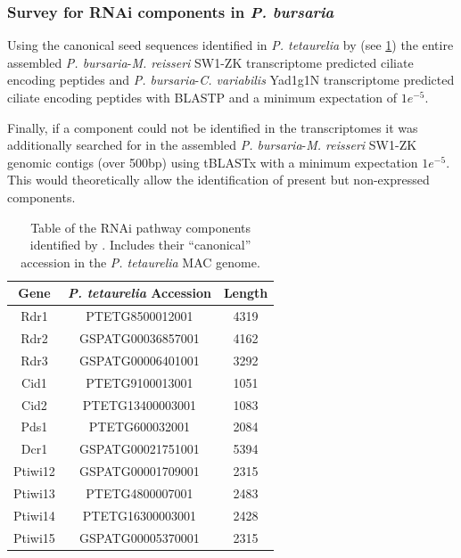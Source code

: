 \subsubsection{Survey for RNAi components in \textit{P. bursaria}}

Using the canonical seed sequences identified in \textit{P. tetaurelia}
by \citep{Marker2014} (see \cref{tab:rnai_seeds}) the entire assembled 
\textit{P. bursaria}-\textit{M. reisseri} SW1-ZK transcriptome predicted
ciliate encoding peptides and
\textit{P. bursaria}-\textit{C. variabilis} Yad1g1N transcriptome predicted 
ciliate encoding peptides with BLASTP and a minimum expectation
of \(1e^{-5}\).

Finally, if a component could not be identified in the transcriptomes
it was additionally searched for in the assembled \textit{P. bursaria}-\textit{M. reisseri} SW1-ZK
genomic contigs (over 500bp) using tBLASTx with a minimum expectation \(1e^{-5}\).
This would theoretically allow the identification of present but non-expressed components.

\begin{table}
    \centering
    \begin{tabular}{|c|c|c|}
        \hline
        \textbf{Gene} & \textbf{\textit{P. tetaurelia} Accession} & \textbf{Length} \\
        \hline
        Rdr1 & PTETG8500012001 & 4319 \\ 
        Rdr2 & GSPATG00036857001 & 4162 \\
        Rdr3 & GSPATG00006401001 & 3292 \\
        Cid1 & PTETG9100013001 & 1051 \\
        Cid2 & PTETG13400003001 & 1083 \\
        Pds1 & PTETG600032001 & 2084 \\
        Dcr1 & GSPATG00021751001 & 5394 \\
        Ptiwi12 & GSPATG00001709001 & 2315 \\
        Ptiwi13 & PTETG4800007001 & 2483 \\
        Ptiwi14 & PTETG16300003001 & 2428 \\
        Ptiwi15 & GSPATG00005370001 & 2315 \\
        \hline
    \end{tabular}
    \caption[RNAi pathway components from \citep{Marker2014}]{Table of
    the RNAi pathway components identified by \citep{Marker2014}. 
    Includes their ``canonical'' accession in the \textit{P. tetaurelia}
MAC genome.}
    \label{tab:rnai_seeds}
\end{table}

